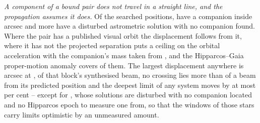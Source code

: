\emph{A component of a bound pair does not travel in a straight line, and the
propagation assumes it does.} Of the \OmNStar{} searched positions,
\OmNComponent{} have a companion inside \OmRadius{} arcsec
\citep{wds,orb6} and \OmNIndOnly{} more have a disturbed astrometric solution
with no companion found. Where the pair has a published visual orbit the
displacement follows from it, where it has not the projected separation puts a
ceiling on the orbital acceleration with the companion's mass taken from
\citet{pecaut2013}, and the Hipparcos--Gaia proper-motion anomaly
\citep{kervella2022} covers \OmNPma{} of them. The largest
displacement anywhere is \OmWorstArcsec{} arcsec at \OmWorstStar,
\OmWorstBeams{} of that block's synthesised beam, no crossing lies more than
\OmCrossWorstBeams{} of a beam from its predicted position and the deepest
limit of any system moves by at most \OmSysMovedMaxPct{} per cent -- except
for \OmFlagStars, whose solutions are disturbed with no companion located and
no Hipparcos epoch to measure one from, so that the \OmNWinFlag{} windows of
those \OmNFlag{} stars carry limits optimistic by an unmeasured amount.

\begin{table}
\centering
\scriptsize
\caption{\textbf{The survey ledger, part one: execution blocks and windows.}
Each row carries its own number, and a group sums to the row whose number
heads it. Hours are window-hours, so the classes partition the hours as they
partition the windows. Rows~3.2 to 3.5 are the archival gap, over which no
result is formed.}
\label{tab:blockledger}

\end{table}

